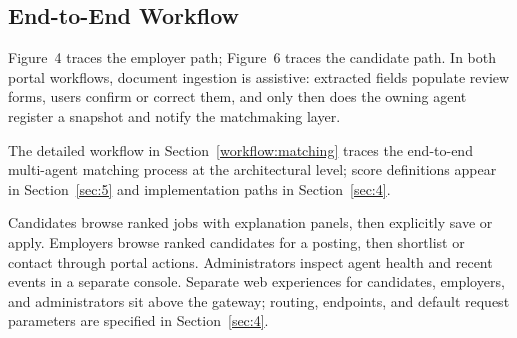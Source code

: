\subsection{End-to-End Workflow}\label{sec:3-workflow}

Figure~4 traces the employer path; Figure~6 traces the candidate path.
In both portal workflows, document ingestion is assistive: extracted fields populate review forms, users confirm or correct them, and only then does the owning agent register a snapshot and notify the matchmaking layer.



The detailed workflow in Section~\ref{workflow:matching} traces the end-to-end multi-agent matching process at the architectural level; score definitions appear in Section~\ref{sec:5} and implementation paths in Section~\ref{sec:4}.

Candidates browse ranked jobs with explanation panels, then explicitly save or apply.
Employers browse ranked candidates for a posting, then shortlist or contact through portal actions.
Administrators inspect agent health and recent events in a separate console.
Separate web experiences for candidates, employers, and administrators sit above the gateway; routing, endpoints, and default request parameters are specified in Section~\ref{sec:4}.
